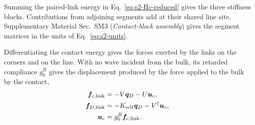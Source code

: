 \documentclass[10pt,aps,onecolumn,floatfix,notitlepage,nofootinbib,showkeys]{revtex4-2}
\newcommand{\vf}{\bm{f}}
\newcommand{\vu}{\bm{u}}
\newcommand{\vq}{\bm{q}}
\begin{document}
Summing the paired-link energy in Eq.~\eqref{eq:s2-Hc-reduced} gives the three stiffness blocks. Contributions from adjoining segments add at their shared line site. Supplementary Material Sec.~SM3 (\emph{Contact-block assembly}) gives the segment matrices in the units of Eq.~\eqref{eq:s2-units}.

Differentiating the contact energy gives the forces exerted by the links on the corners and on the line. With no wave incident from the bulk, its retarded compliance $g_0^R$ gives the displacement produced by the force applied to the bulk by the contact,
\begin{align}
 \vf_{c,\rm link}&=-V\vq_D-U\vu_c,
 \label{eq:s5-corner-reaction}\\
 \vf_{D,\rm link}&=-K_{\rm self}\vq_D-V^\dagger\vu_c,
 \label{eq:s5-line-reaction}\\
 \vu_c&=g_0^R\vf_{c,\rm link}.
 \label{eq:s5-bulk-load}
\end{align}
\end{document}
